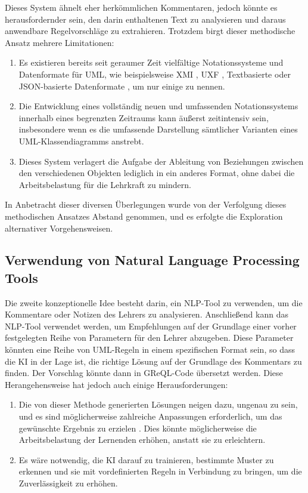 Dieses System ähnelt eher herkömmlichen Kommentaren, jedoch könnte es herausfordernder sein, den darin enthaltenen Text zu analysieren und daraus anwendbare Regelvorschläge zu extrahieren. Trotzdem birgt dieser methodische Ansatz mehrere Limitationen:

\begin{enumerate}
    \item Es existieren bereits seit geraumer Zeit vielfältige Notationssysteme und Datenformate für UML, wie beispielsweise XMI \cite{skogan1999uml}, \ac{UXF} \cite{suzuki1998making}, Textbasierte \cite{washizaki2010tcd} oder JSON-basierte Datenformate \cite{benson2021uml}, um nur einige zu nennen.

    \item Die Entwicklung eines vollständig neuen und umfassenden Notationssystems innerhalb eines begrenzten Zeitraums kann äußerst zeitintensiv sein, insbesondere wenn es die umfassende Darstellung sämtlicher Varianten eines UML-Klassendiagramms anstrebt.

    \item Dieses System verlagert die Aufgabe der Ableitung von Beziehungen zwischen den verschiedenen Objekten lediglich in ein anderes Format, ohne dabei die Arbeitsbelastung für die Lehrkraft zu mindern.
\end{enumerate}


In Anbetracht dieser diversen Überlegungen wurde von der Verfolgung dieses methodischen Ansatzes Abstand genommen, und es erfolgte die Exploration alternativer Vorgehensweisen.


\subsection{Verwendung von Natural Language Processing  Tools}

Die zweite konzeptionelle Idee besteht darin, ein \ac{NLP}-Tool zu verwenden, um die Kommentare oder Notizen des Lehrers zu analysieren. Anschließend kann das NLP-Tool verwendet werden, um Empfehlungen auf der Grundlage einer vorher festgelegten Reihe von Parametern für den Lehrer abzugeben. Diese Parameter könnten eine Reihe von UML-Regeln in einem spezifischen Format sein, so dass die KI in der Lage ist, die richtige Lösung auf der Grundlage des Kommentars zu finden. Der Vorschlag könnte dann in GReQL-Code übersetzt werden. Diese Herangehensweise hat jedoch auch einige Herausforderungen:

\begin{enumerate}
    \item Die von dieser Methode generierten Lösungen neigen dazu, ungenau zu sein, und es sind möglicherweise zahlreiche Anpassungen erforderlich, um das gewünschte Ergebnis zu erzielen \cite{chowdhary2020natural}. Dies könnte möglicherweise die Arbeitsbelastung der Lernenden erhöhen, anstatt sie zu erleichtern.
    \item Es wäre notwendig, die KI darauf zu trainieren, bestimmte Muster zu erkennen und sie mit vordefinierten Regeln in Verbindung zu bringen, um die Zuverlässigkeit zu erhöhen.

\end{enumerate}

